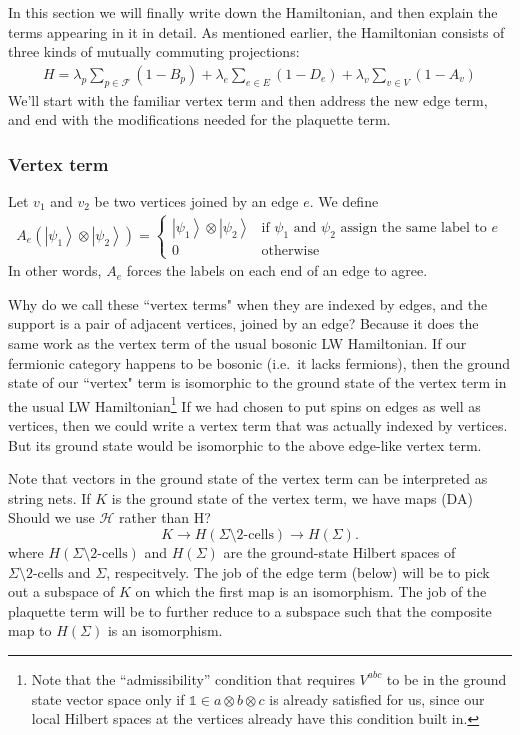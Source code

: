 \documentclass[12pt,a4paper]{article}
\newcommand{\tp}{\otimes}
\newcommand{\unit}{\mathds{1}}
\newcommand{\mch}{\mathcal{H}}
\newcommand\be            {\begin{equation}}
\newcommand\ee            {\end{equation}}
\newcommand{\ket}[1]{\ensuremath{\left|#1\right\rangle}}
\newcommand{\dave}[1]{{\color{ao(english)}\footnotesize{(DA) #1}}}
\begin{document}
In this section we will finally write down the Hamiltonian, and then explain the terms appearing in it in detail. 
As mentioned earlier, the Hamiltonian consists of three kinds of mutually commuting projections:
\begin{align}
H = \lambda_p \sum_{p \in \mathcal{F}} (1-B_p)  + \lambda_e \sum_{e \in E} (1-D_e) + \lambda_v \sum_{v \in V} (1-A_v)
\end{align}
We'll start with the familiar vertex term and then address the new edge term, 
and end with the modifications needed for the plaquette term.




\subsubsection{Vertex term}   \label{VertexHamiltonian}

Let $v_1$ and $v_2$ be two vertices joined by an edge $e$.
We define
\begin{align}
A_e(\ket{\psi_1} \otimes \ket{\psi_2}) = 
\left\{
                \begin{array}{ll}
                   \ket{\psi_1} \otimes \ket{\psi_2} & \text{if $\psi_1$ and $\psi_2$ assign the same label to $e$} \\
                  0 & \text{otherwise}
                \end{array}
              \right.
\end{align}
In other words, $A_e$ forces the labels on each end of an edge to agree.

Why do we call these ``vertex terms" when they are indexed by edges, and the support is a pair of adjacent vertices, joined by an edge?
Because it does the same work as the vertex term of the usual bosonic LW Hamiltonian.
If our fermionic category happens to be bosonic (i.e.\ it lacks fermions), then the ground state of our ``vertex" term is isomorphic to the ground state
of the vertex term in the usual LW Hamiltonian\footnote{Note that the ``admissibility'' condition that requires $V^{abc}$ to be in the ground state vector space only if $\unit\in a\tp b \tp c$ is already satisfied for us, since our local Hilbert spaces at the vertices already have this condition built in.}
If we had chosen to put spins on edges as well as vertices, then we could write a vertex term that was actually indexed by vertices.
But its ground state would be isomorphic to the above edge-like vertex term.

Note that vectors in the ground state of the vertex term can be interpreted as string nets.
If $K$ is the ground state of the vertex term, we have maps
\dave{Should we use $\mch$ rather than H?}
\be
	K \to H(\Sigma \setminus \mbox{2-cells}) \to H(\Sigma) .
	\label{ground_state_projection}
\ee
where $H(\Sigma \setminus \mbox{2-cells})$ and $H(\Sigma)$ are the ground-state Hilbert spaces of $\Sigma \setminus \mbox{2-cells}$ and $\Sigma$, respecitvely.
The job of the edge term (below) will be to pick out a subspace of $K$ on which the first map is an isomorphism. 
The job of the plaquette term will be to further reduce to a subspace such that the composite map to $H(\Sigma)$ is an isomorphism.
\end{document}
